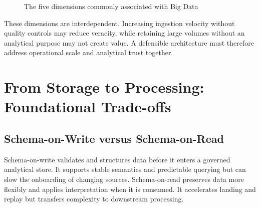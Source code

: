 \begin{figure}[H]
    \centering
    \caption{The five dimensions commonly associated with Big Data}
    \label{fig:theory-five-vs}
\end{figure}

These dimensions are interdependent. Increasing ingestion velocity without quality controls may reduce veracity, while retaining large volumes without an analytical purpose may not create value. A defensible architecture must therefore address operational scale and analytical trust together.

\section{From Storage to Processing: Foundational Trade-offs}

\subsection{Schema-on-Write versus Schema-on-Read}
Schema-on-write validates and structures data before it enters a governed analytical store. It supports stable semantics and predictable querying but can slow the onboarding of changing sources. Schema-on-read preserves data more flexibly and applies interpretation when it is consumed. It accelerates landing and replay but transfers complexity to downstream processing.

